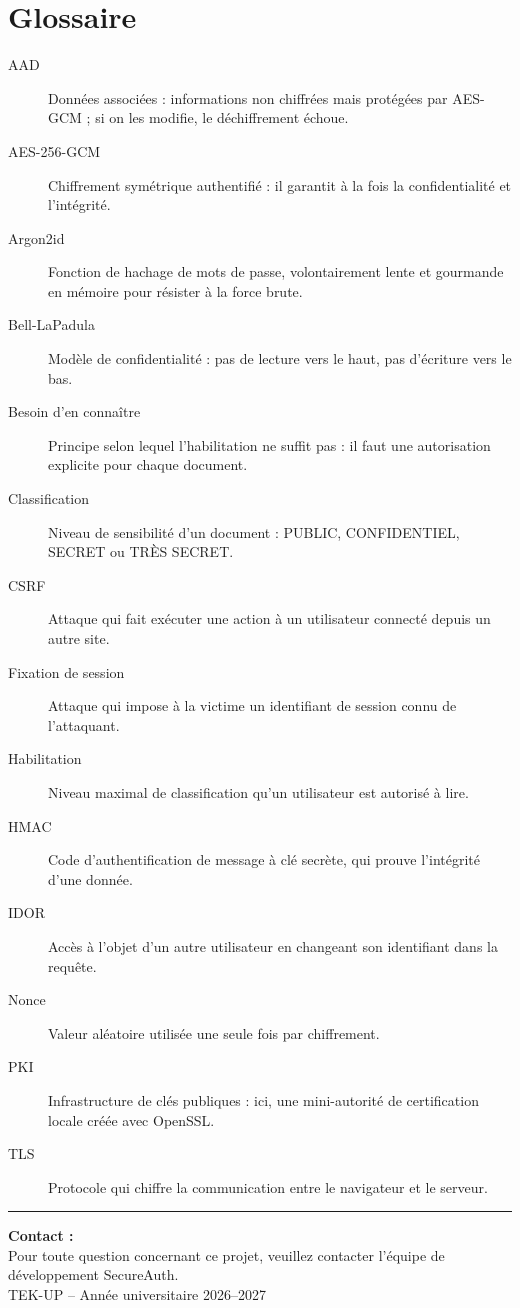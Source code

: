 \documentclass[12pt,a4paper]{report}
\begin{document}
\appendix
\chapter{Glossaire}

\begin{description}
  \item[AAD] Données associées : informations non chiffrées mais protégées par AES-GCM ; si on les modifie, le déchiffrement échoue.
  \item[AES-256-GCM] Chiffrement symétrique authentifié : il garantit à la fois la confidentialité et l'intégrité.
  \item[Argon2id] Fonction de hachage de mots de passe, volontairement lente et gourmande en mémoire pour résister à la force brute.
  \item[Bell-LaPadula] Modèle de confidentialité : pas de lecture vers le haut, pas d'écriture vers le bas.
  \item[Besoin d'en connaître] Principe selon lequel l'habilitation ne suffit pas : il faut une autorisation explicite pour chaque document.
  \item[Classification] Niveau de sensibilité d'un document : PUBLIC, CONFIDENTIEL, SECRET ou TRÈS SECRET.
  \item[CSRF] Attaque qui fait exécuter une action à un utilisateur connecté depuis un autre site.
  \item[Fixation de session] Attaque qui impose à la victime un identifiant de session connu de l'attaquant.
  \item[Habilitation] Niveau maximal de classification qu'un utilisateur est autorisé à lire.
  \item[HMAC] Code d'authentification de message à clé secrète, qui prouve l'intégrité d'une donnée.
  \item[IDOR] Accès à l'objet d'un autre utilisateur en changeant son identifiant dans la requête.
  \item[Nonce] Valeur aléatoire utilisée une seule fois par chiffrement.
  \item[PKI] Infrastructure de clés publiques : ici, une mini-autorité de certification locale créée avec OpenSSL.
  \item[TLS] Protocole qui chiffre la communication entre le navigateur et le serveur.
\end{description}

\vspace{1.2cm}
\hrule
\vspace{0.5cm}
\begin{center}
\textbf{Contact :}\\
Pour toute question concernant ce projet, veuillez contacter l'équipe de développement SecureAuth.\\
TEK-UP -- Année universitaire 2026--2027
\end{center}
\end{document}
